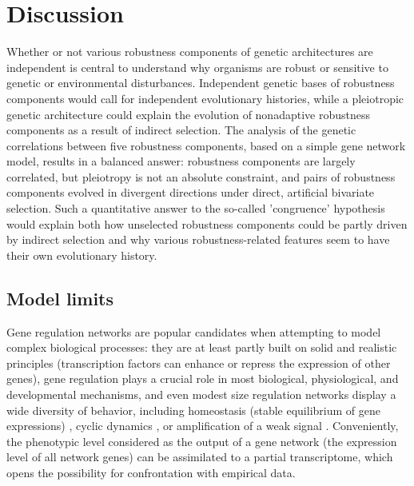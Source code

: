\documentclass[10pt,a4paper]{article}
\begin{document}
\section{Discussion}

Whether or not various robustness components of genetic architectures are independent is central to understand why organisms are robust or sensitive to genetic or environmental disturbances. Independent genetic bases of robustness components would call for independent evolutionary histories, while a pleiotropic genetic architecture could explain the evolution of nonadaptive robustness components as a result of indirect selection. The analysis of the genetic correlations between five robustness components, based on a simple gene network model, results in a balanced answer: robustness components are largely correlated, but pleiotropy is not an absolute constraint, and pairs of robustness components evolved in divergent directions under direct, artificial bivariate selection. Such a quantitative answer to the so-called 'congruence' hypothesis \citep{dHW+03} would explain both how unselected robustness components could be partly driven by indirect selection and why various robustness-related features seem to have their own evolutionary history. 

\subsection{Model limits}

Gene regulation networks are popular candidates when attempting to model complex biological processes: they are at least partly built on solid and realistic principles (transcription factors can enhance or repress the expression of other genes), gene regulation plays a crucial role in most biological, physiological, and developmental mechanisms, and even modest size regulation networks display a wide diversity of behavior, including homeostasis (stable equilibrium of gene expressions) \citep{Ste99}, cyclic dynamics \citep{LG03,ARB+10}, or amplification of a weak signal \citep{HB08}. Conveniently, the phenotypic level considered as the output of a gene network (the expression level of all network genes) can be assimilated to a partial transcriptome, which opens the possibility for confrontation with empirical data. 
\end{document}
